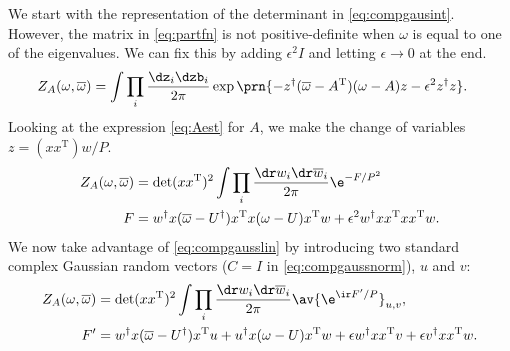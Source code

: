 \documentclass[12pt]{article}
\newcommand{\inv}{^{-1}}
\newcommand{\dg}{^\dagger}
\newcommand{\trans}{^\mathrm{T}}
\newcommand{\omb}{\overline{\omega}}
\newcommand{\dw}{\dr w}
\newcommand{\dwb}{\dr\overline{w}}
\begin{document}
We start with the representation of the determinant in \eqref{eq:compgausint}.
However, the matrix in \eqref{eq:partfn} is not positive-definite when $\omega$ is equal to one of the eigenvalues.
We can fix this by adding $\epsilon^2I$ and letting $\epsilon\to0$ at the end.
%
\begin{equation}\label{eq:partfnintz}
\begin{aligned}
  Z_A(\omega,\omb) &= \int \prod_i\frac{\dz_i\dzb_i}{2\pi} \exp\prn{
    -z\dg (\omb-A\trans)(\omega-A) z - \epsilon^2 z\dg z} .%
\end{aligned}
\end{equation}
%
Looking at the expression \eqref{eq:Aest} for $A$, we make the change of variables $z=(xx\trans)w/P$.
%
\begin{equation}\label{eq:partfnintw}
\begin{aligned}
  Z_A(\omega,\omb) &= \det(xx\trans)^2 \int \prod_i\frac{\dw_i\dwb_i}{2\pi}\e^{-F/P^2}
    \\
  F &=
     w\dg x(\omb-U\dg)x\trans x(\omega-U)x\trans w + \epsilon^2 w\dg xx\trans xx\trans w .%
\end{aligned}
\end{equation}
%
We now take advantage of \eqref{eq:compgausslin} by introducing two standard complex Gaussian random vectors ($C=I$ in \eqref{eq:compgaussnorm}), $u$ and $v$:
%
\begin{equation}\label{eq:partfnintwuv}
\begin{aligned}
  Z_A(\omega,\omb) &= \det(xx\trans)^2 \int \prod_i\frac{\dw_i\dwb_i}{2\pi} \av{\e^{\ir F'/P}}_{u,v},\\
  F' &=
    w\dg x(\omb-U\dg)x\trans u + u\dg x(\omega-U)x\trans w + \epsilon w\dg xx\trans v + \epsilon v\dg xx\trans w .%
\end{aligned}
\end{equation}
%
\end{document}

